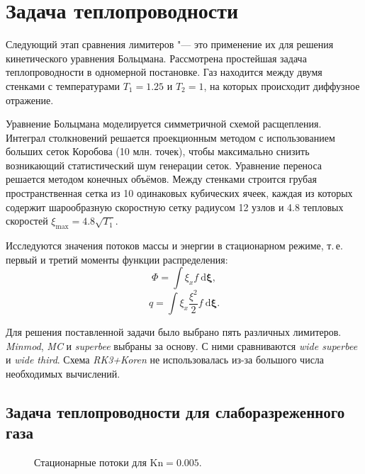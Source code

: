 \documentclass[a4paper,10pt]{article}
\newcommand{\dd}{\:\mathrm{d}}
\newcommand{\Kn}{\mathrm{Kn}}
\begin{document}
\newpage
\section{Задача теплопроводности}
Следующий этап сравнения лимитеров "--- это применение их для решения кинетического уравнения Больцмана.
Рассмотрена простейшая задача теплопроводности в одномерной постановке.
Газ находится между двумя стенками с температурами \(T_1=1.25\) и \(T_2=1\), на которых происходит диффузное отражение.

Уравнение Больцмана моделируется симметричной схемой расщепления.
Интеграл столкновений решается проекционным методом с использованием больших сеток Коробова (10 млн. точек),
чтобы максимально снизить возникающий статистический шум генерации сеток.
Уравнение переноса решается методом конечных объёмов.
Между стенками строится грубая пространственная сетка из 10 одинаковых кубических ячеек,
каждая из которых содержит шарообразную скоростную сетку радиусом 12 узлов и 4.8 тепловых скоростей \( \xi_{\max} = 4.8\sqrt{T_1} \).

Исследуются значения потоков массы и энергии в стационарном режиме, т.\,е. первый и третий моменты функции распределения:
\[ \Phi = \int{\xi_x f \dd\boldsymbol\xi}, \]
\[ q = \int{\xi_x\frac{\xi^2}{2} f \dd\boldsymbol\xi}. \]

Для решения поставленной задачи было выбрано пять различных лимитеров.
\textit{Minmod}, \textit{MC} и \textit{superbee} выбраны за основу.
С ними сравниваются \textit{wide superbee} и \textit{wide third}.
Схема \textit{RK3+Koren} не использовалась из-за большого числа необходимых вычислений.

\subsection{Задача теплопроводности для слаборазреженного газа}
\begin{figure}[h]
	\caption{Стационарные потоки для \(\Kn=0.005\).}\label{fig:flows_dens}
\end{figure}
\end{document}

